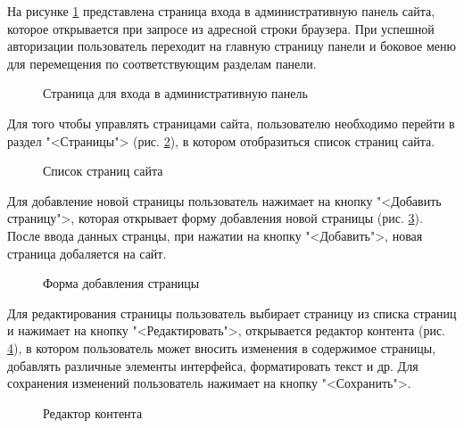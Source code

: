 На рисунке \ref{ui7:image} представлена страница входа в административную панель сайта, которое открывается при запросе из адресной строки браузера. При успешной авторизации пользователь переходит на главную страницу панели и боковое меню для перемещения по соответствующим разделам панели.

\begin{figure}[H]
	\center{\texttt{[image: ui7]}}
	\caption{Страница для входа в административную панель}
	\label{ui7:image}
\end{figure}

%

Для того чтобы управлять страницами сайта, пользователю необходимо перейти в раздел "<Страницы"> (рис. \ref{ui8:image}), в котором отобразиться список страниц сайта. 

\begin{figure}[H]
	\center{\texttt{[image: ui8]}}
	\caption{Список страниц сайта}
	\label{ui8:image}
\end{figure}

Для добавление новой страницы пользователь нажимает на кнопку "<Добавить страницу">, которая открывает форму добавления новой страницы (рис. \ref{ui9:image}). После ввода данных странцы, при нажатии на кнопку "<Добавить">, новая страница добаляется на сайт.

\begin{figure}[H]
	\center{\texttt{[image: ui9]}}
	\caption{Форма добавления страницы}
	\label{ui9:image}
\end{figure}

Для редактирования страницы пользователь выбирает страницу из списка страниц и нажимает на кнопку "<Редактировать">, открывается редактор контента (рис. \ref{ui10:image}), в котором пользователь может вносить изменения в содержимое страницы, добавлять различные элементы интерфейса, форматировать текст и др. Для сохранения изменений пользователь нажимает на кнопку "<Сохранить">.

\begin{figure}[H]
	\center{\texttt{[image: ui10]}}
	\caption{Редактор контента}
	\label{ui10:image}
\end{figure}

